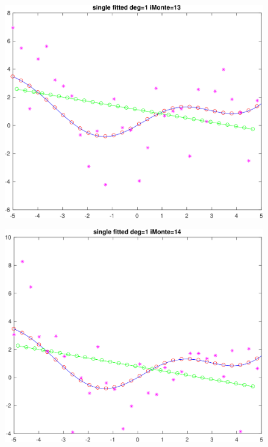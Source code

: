\begin{figure}[h!]
\centering\includegraphics[scale=0.1]{single_poly_d_1_iMonte_13.png}
\end{figure}


\begin{figure}[h!]
\centering\includegraphics[scale=0.1]{single_poly_d_1_iMonte_14.png}
\end{figure}

